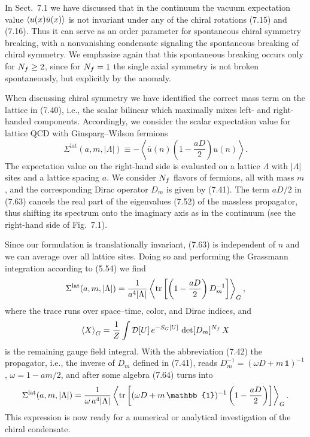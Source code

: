 In Sect.~7.1 we have discussed that in the continuum the vacuum expectation
value $\left\langle u(x)\bar{u}(x) \right\rangle$ is not invariant under any of the chiral rotations
(7.15) and (7.16). Thus it can serve as an order parameter for spontaneous
chiral symmetry breaking, with a nonvanishing condensate signaling the
spontaneous breaking of chiral symmetry. We emphasize again that this
spontaneous breaking occurs only for $N_f \geq 2$, since for $N_f = 1$ the
single axial symmetry is not broken spontaneously, but explicitly by the
anomaly.

When discussing chiral symmetry we have identified the correct mass term on
the lattice in (7.40), i.e., the scalar bilinear which maximally mixes left-
and right-handed components. Accordingly, we consider the scalar expectation
value for lattice QCD with Ginsparg--Wilson fermions
\begin{equation}
  \Sigma^{\mathrm{lat}}(a, m, |\Lambda|) \equiv
  -\left\langle \bar{u}(n)\left(1-\frac{aD}{2}\right)u(n)\right\rangle .
\end{equation}
The expectation value on the right-hand side is evaluated on a lattice
$\Lambda$ with $|\Lambda|$ sites and a lattice spacing $a$. We consider $N_f$
flavors of fermions, all with mass $m$, and the corresponding Dirac operator
$D_m$ is given by (7.41). The term $aD/2$ in (7.63) cancels the real part of
the eigenvalues (7.52) of the massless propagator, thus shifting its spectrum
onto the imaginary axis as in the continuum (see the right-hand side of
Fig.~7.1).

Since our formulation is translationally invariant, (7.63) is independent of
$n$ and we can average over all lattice sites. Doing so and performing the
Grassmann integration according to (5.54) we find
\begin{equation}
  \Sigma^{\mathrm{lat}}(a, m, |\Lambda|) =
  \frac{1}{a^4|\Lambda|}\left\langle
    \operatorname{tr}\left[\left(1-\frac{aD}{2}\right)D_m^{-1}\right]
  \right\rangle_G,
\end{equation}
where the trace runs over space--time, color, and Dirac indices, and
\begin{equation}
  \left\langle X \right\rangle_G = \frac{1}{Z}\int \mathcal{D}[U]\,e^{-S_G[U]}\,\det[D_m]^{N_f}\,X
\end{equation}
is the remaining gauge field integral. With the abbreviation (7.42) the
propagator, i.e., the inverse of $D_m$ defined in (7.41), reads
$D_m^{-1} = (\omega D + m\,\mathbb{1})^{-1}$, $\omega = 1 - am/2$, and after
some algebra (7.64) turns into
\begin{equation}
  \Sigma^{\mathrm{lat}}(a, m, |\Lambda|) =
  \frac{1}{\omega\, a^4|\Lambda|}\left\langle
    \tr\left[(\omega D + m\,\mathbb{1})^{-1}\left(1-\frac{aD}{2}\right)\right]
  \right\rangle_G .
\end{equation}
This expression is now ready for a numerical or analytical investigation of
the chiral condensate.

